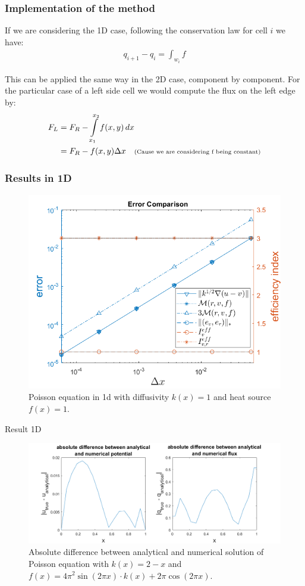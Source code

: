\documentclass[t]{beamer}
\begin{document}
\begin{frame}
\frametitle{Implementation of the method}

If we are considering the 1D case, following the conservation law for cell $i$ we have:
\begin{align*}
q_{i+1} - q_i =  \int_{w_i} f
\end{align*}

This can be applied the same way in the 2D case, component by component. For the particular case of a left side cell we would compute the flux on the left edge by:
\begin{align*}
F_L &= F_R - \int\limits_{x_1}^{x_2} f(x,y) \,dx\ \\
&=  F_R - f(x,y)\Delta x \quad \text{\scriptsize{(Cause we are considering f being constant)}}
\end{align*}
\end{frame}

\begin{frame}
\frametitle{Results in 1D }
\vspace{-18pt}
\begin{figure}[t]
\includegraphics[width = 0.7\linewidth]{convergenceplot_k_f_constant.png}
\caption{Poisson equation in 1d with diffusivity $k(x) = 1$ and heat source $f(x) = 1$.}
\label{fig:Convergence1d1}
\end{figure}
\end{frame}

\begin{frame}{Result 1D}
\begin{figure}
\centering
\includegraphics[width = 1.05\linewidth, left]{difference_analytical_numerical.png}
\caption{Absolute difference between analytical and numerical solution of Poisson equation with $k(x) = 2-x$ and $f(x) = 4\pi^2\sin(2\pi x)\cdot k(x) + 2\pi\cos(2\pi x)$.}
\label{fig:fig:diff}
\end{figure}
\end{frame}
\end{document}
